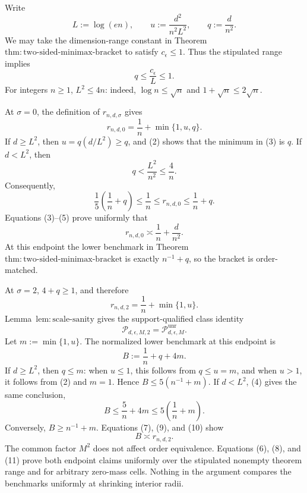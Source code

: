 Write
\[
 L:=\log(en),\qquad
 u:=\frac{d^2}{n^2L^2},\qquad
 q:=\frac d{n^2}.
\tag{1}
\]
We may take the dimension-range constant in Theorem~\(\mathrm{thm:two\text{-}sided\text{-}minimax\text{-}bracket}\) to satisfy \(c_{\epsilon}\le1\).  Thus the stipulated range implies
\[
 q\le\frac{c_{\epsilon}}L\le1.
\tag{2}
\]
For integers \(n\ge1\), \(L^2\le4n\): indeed, \(\log n\le\sqrt n\) and \(1+\sqrt n\le2\sqrt n\).

At \(\sigma=0\), the definition of \(r_{n,d,\sigma}\) gives
\[
 r_{n,d,0}=\frac1n+\min\{1,u,q\}.
\tag{3}
\]
If \(d\ge L^2\), then \(u=q(d/L^2)\ge q\), and (2) shows that the minimum in (3) is \(q\).  If \(d<L^2\), then
\[
 q<\frac{L^2}{n^2}\le\frac4n.
\tag{4}
\]
Consequently,
\[
 \frac15\left(\frac1n+q\right)
 \le \frac1n
 \le r_{n,d,0}
 \le \frac1n+q.
\tag{5}
\]
Equations (3)--(5) prove uniformly that
\[
 r_{n,d,0}\asymp \frac1n+\frac d{n^2}.
\tag{6}
\]
At this endpoint the lower benchmark in Theorem~\(\mathrm{thm:two\text{-}sided\text{-}minimax\text{-}bracket}\) is exactly \(n^{-1}+q\), so the bracket is order-matched.

At \(\sigma=2\), \(4+q\ge1\), and therefore
\[
 r_{n,d,2}=\frac1n+\min\{1,u\}.
\tag{7}
\]
Lemma~\(\mathrm{lem:scale\text{-}sanity}\) gives the support-qualified class identity
\[
 \mathcal P_{d,\epsilon,M,2}=\mathcal P_{d,\epsilon,M}^{\mathrm{unr}}.
\tag{8}
\]
Let \(m:=\min\{1,u\}\).  The normalized lower benchmark at this endpoint is
\[
 B:=\frac1n+q+4m.
\tag{9}
\]
If \(d\ge L^2\), then \(q\le m\): when \(u\le1\), this follows from \(q\le u=m\), and when \(u>1\), it follows from (2) and \(m=1\).  Hence \(B\le5(n^{-1}+m)\).  If \(d<L^2\), (4) gives the same conclusion,
\[
 B\le\frac5n+4m\le5\left(\frac1n+m\right).
\tag{10}
\]
Conversely, \(B\ge n^{-1}+m\).  Equations (7), (9), and (10) show
\[
 B\asymp r_{n,d,2}.
\tag{11}
\]
The common factor \(M^2\) does not affect order equivalence.  Equations (6), (8), and (11) prove both endpoint claims uniformly over the stipulated nonempty theorem range and for arbitrary zero-mass cells.  Nothing in the argument compares the benchmarks uniformly at shrinking interior radii.